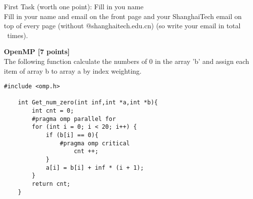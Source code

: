 \documentclass[addpoints, 12pt]{exam}
\begin{document}
\begin{questions}

\question[1] First Task (worth one point): Fill in you name\\
Fill in your name and email on the front page and your ShanghaiTech email on top of every page (without @shanghaitech.edu.cn) (so write your email in total \numpages ~times).


\newpage
\question \textbf{OpenMP [7 points]}\\
The following function calculate the numbers of 0 in the array 'b' and 
assign each item of array b to array a by index weighting.

\begin{lstlisting}[style = S]
    #include <omp.h>

    int Get_num_zero(int inf,int *a,int *b){
        int cnt = 0;
        #pragma omp parallel for
        for (int i = 0; i < 20; i++) {
            if (b[i] == 0){
                #pragma omp critical
                    cnt ++;
            }
            a[i] = b[i] + inf * (i + 1);
        }
        return cnt;
    }
\end{lstlisting}

\end{questions}
\end{document}
